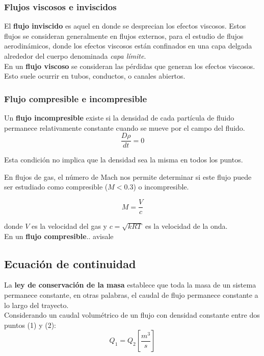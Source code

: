 \subsubsection{Flujos viscosos e inviscidos}
El \textbf{flujo inviscido} es aquel en donde se desprecian los efectos viscosos. Estos flujos se consideran generalmente en flujos externos, para el estudio de flujos aerodinámicos, donde los efectos viscosos están confinados en una capa delgada alrededor del cuerpo denominada \emph{capa límite}. \\

En un \textbf{flujo viscoso} se consideran las pérdidas que generan los efectos viscosos. Esto suele ocurrir en tubos, conductos, o canales abiertos. 

\subsubsection{Flujo compresible e incompresible}
		
Un \textbf{flujo incompresible} existe si la densidad de cada partícula de fluido permanece relativamente constante cuando se mueve por el campo del fluido.
\begin{equation*}
	\dfrac{D \rho}{dt} = 0
\end{equation*}

Esta condición no implica que la densidad sea la misma en todos los puntos.

En flujos de gas, el número de Mach nos permite determinar si este flujo puede ser estudiado como compresible ($M < 0.3$) o incompresible.

\begin{equation*}
	M = \dfrac{V}{c}
\end{equation*}

donde $V$ es la velocidad del gas y $c=\sqrt{k R T}$ es la velocidad de la onda.\\


En un \textbf{flujo compresible}.. avisale


\subsection{Ecuación de continuidad}

La \textbf{ley de conservación de la masa} establece que toda la masa de un sistema permanece constante, en otras palabras, el caudal de flujo permanece constante a lo largo del trayecto.\\


Considerando un caudal volumétrico de un flujo con densidad constante entre dos puntos (1) y (2):
\begin{equation*}
	Q_1 = Q_2 \left[\dfrac{m^3}{s}\right]
\end{equation*}

